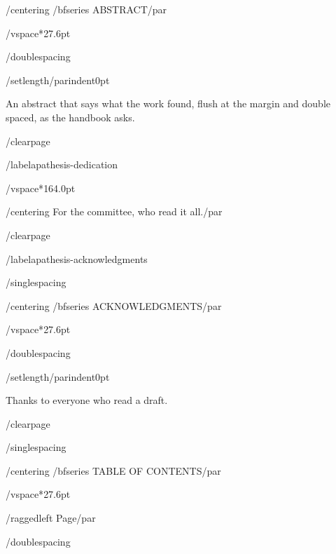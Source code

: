 {/centering
/bfseries ABSTRACT/par}

/vspace*{27.6pt}

/doublespacing

{/setlength{/parindent}{0pt}

An abstract that says what the work found, flush at the margin and
double spaced, as the handbook asks.

}

/clearpage

/label{apathesis-dedication}

/vspace*{164.0pt}

{/centering
For the committee, who read it all./par}

/clearpage

/label{apathesis-acknowledgments}

/singlespacing

{/centering
/bfseries ACKNOWLEDGMENTS/par}

/vspace*{27.6pt}

/doublespacing

{/setlength{/parindent}{0pt}

Thanks to everyone who read a draft.

}

/clearpage

/singlespacing

{/centering
/bfseries TABLE OF CONTENTS/par}

/vspace*{27.6pt}

{/raggedleft
Page/par}

/doublespacing

